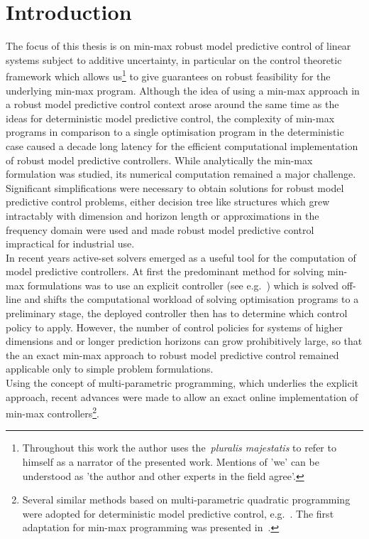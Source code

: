 
\chapter{Introduction}
%
%
%
%
%
The focus of this thesis is on min-max robust model predictive control of linear systems subject to additive uncertainty, in particular on the control theoretic framework which allows us\footnote{%
%
Throughout this work the author uses the~\emph{pluralis majestatis} to refer to himself as a narrator of the presented work.
%
Mentions of 'we' can be understood as 'the author and other experts in the field agree'.
}
to give guarantees on robust feasibility for the underlying min-max program.
%
Although the idea of using a min-max approach in a robust model predictive control context arose around the same time as the ideas for deterministic model predictive control, the complexity of min-max programs in comparison to a single optimisation program in the deterministic case caused a decade long latency for the efficient computational implementation of robust model predictive controllers.
%
While analytically the min-max formulation was studied, its numerical computation remained a major challenge.
%
Significant simplifications were necessary to obtain solutions for robust model predictive control problems, either decision tree like structures which grew intractably with dimension and horizon length or approximations in the frequency domain were used and made robust model predictive control impractical for industrial use.
%
\\[1em]
%
In recent years active-set solvers emerged as a useful tool for the computation of model predictive controllers.
%
At first the predominant method for solving min-max formulations was to use an explicit controller (see e.g.~\cite{Bemporad:2003}) which is solved off-line and shifts the computational workload of solving optimisation programs to a preliminary stage, the deployed controller then has to determine which control policy to apply.
%
However, the number of control policies for systems of higher dimensions and or longer prediction horizons can grow prohibitively large, so that the an exact min-max approach to robust model predictive control remained applicable only to simple problem formulations.
%
\\[1em]
%
Using the concept of multi-parametric programming, which underlies the explicit approach, recent advances were made to allow an exact online implementation of min-max controllers\footnote{%
%
Several similar methods based on multi-parametric quadratic programming~\cite{Best:1996} were adopted for deterministic model predictive control, e.g.~\cite{Wirsching:2007,Ferreau:2008,Cannon:2008,Ferreau:2006}.
%
The first adaptation for min-max programming was presented in~\cite{Buerger:2011}.
%
}.
